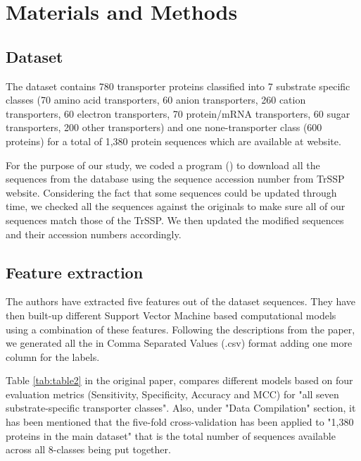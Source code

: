 \section{Materials and Methods}

    \subsection{Dataset}

    The dataset contains 780 transporter proteins classified into 7 substrate specific classes (70 amino acid transporters, 
    60 anion transporters, 260 cation transporters, 60 electron transporters, 70 protein/mRNA transporters, 60 sugar 
    transporters, 200 other transporters) and one none-transporter class (600 proteins) for a total of 1,380 protein 
    sequences which are available at   website.
    
    For the purpose of our study, we coded a program () to download all the sequences from the 
     database using the sequence accession number from TrSSP website. 
    Considering the fact that some sequences could be updated through time, we checked all the  
    sequences against the originals to make sure all of our sequences match those of the TrSSP. We then updated the 
    modified sequences and their accession numbers accordingly.

    \subsection{Feature extraction}

    The authors \cite{mishra2014prediction} have extracted five features out of the dataset sequences. They have then built-up different Support Vector Machine based 
    computational models using a combination of these features. Following the descriptions from the paper, we generated all the 
     in Comma Separated Values (.csv) format adding one more column for the labels.

    Table \ref{tab:table2} in the original paper, compares different models based on four evaluation metrics (Sensitivity, Specificity, Accuracy and MCC) for 
    "all seven substrate-specific transporter classes". Also, under "Data Compilation" section, it has been mentioned that the five-fold 
    cross-validation has been applied to "1,380 proteins in the main dataset" that is the total number of sequences available across 
    all 8-classes being put together.

